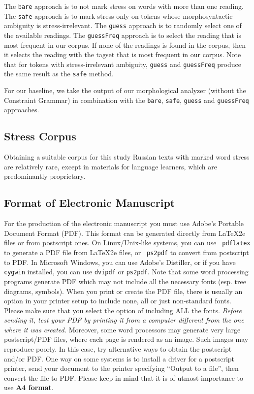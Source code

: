 \documentclass[11pt]{article}
\begin{document}
The {\small {\tt bare}} approach is to not mark stress on words with more than one reading.
The {\small {\tt safe}} approach is to mark stress only on
tokens whose morphosyntactic ambiguity is stress-irrelevant. The {\small {\tt guess}}
approach is to randomly select one of the available readings.
The {\small {\tt guessFreq}} approach is to select the reading that is most frequent
in our corpus. If none of the readings is found in the corpus, then it selects the reading
with the tagset that is most frequent in our corpus. Note that for tokens with
stress-irrelevant ambiguity, {\small {\tt guess}} and {\small {\tt guessFreq}} produce
the same result as the {\small {\tt safe}} method.

For our baseline, we take the output of our morphological analyzer (without the Constraint 
Grammar) in combination with the {\small {\tt bare}}, {\small {\tt safe}}, 
{\small {\tt guess}} and {\small {\tt guessFreq}} approaches.

\subsection{Stress Corpus}

Obtaining a suitable corpus for this study Russian texts with marked word stress are relatively rare, except in materials
for language learners, which are predominantly proprietary.


\subsection{Format of Electronic Manuscript}
\label{sect:pdf}

For the production of the electronic manuscript you must use Adobe's
Portable Document Format (PDF). 
This format can be generated directly from \LaTeX2e files or from
postscript ones. On Linux/Unix-like systems, you can use {\tt
  pdflatex} to generate a PDF file from \LaTeX2e files, or {\tt
  ps2pdf} to convert from postscript to PDF. 
In Microsoft Windows, you can use Adobe's Distiller, or if you have
\texttt{cygwin} installed, you can use \texttt{dvipdf} or
\texttt{ps2pdf}. Note that some word processing programs generate PDF
which may not include all the necessary fonts (esp. tree diagrams,
symbols). When you print or create the PDF file, there is usually an
option in your printer setup to include none, all or just non-standard
fonts.  Please make sure that you select the option of including ALL
the fonts. {\em Before sending it, test your PDF by printing it from a
  computer different from the one where it was created.} Moreover,
some word processors may generate very large postscript/PDF files,
where each page is rendered as an image. Such images may reproduce
poorly. In this case, try alternative ways to obtain the postscript
and/or PDF. One way on some systems is to install a driver for a
postscript printer, send your document to the printer specifying
``Output to a file'', then convert the file to PDF.
Please keep in mind that it is of utmost importance to use \textbf{A4 format}.
\end{document}

